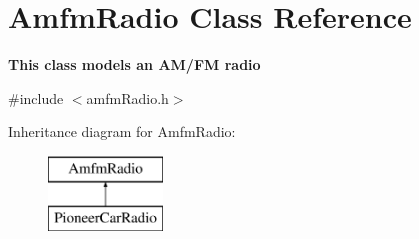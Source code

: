 \hypertarget{class_amfm_radio}{\section{Amfm\-Radio Class Reference}
\label{class_amfm_radio}
}


{\bfseries This class models an A\-M/\-F\-M radio}  




{\ttfamily \#include $<$amfm\-Radio.\-h$>$}

Inheritance diagram for Amfm\-Radio\-:\begin{figure}[H]
\begin{center}
\leavevmode
\includegraphics[height=2.000000cm]{class_amfm_radio}
\end{center}
\end{figure}
